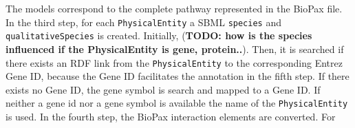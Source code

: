 \documentclass{bioinfo}
\begin{document}
\begin{methods}
The models correspond to the complete pathway represented in the BioPax file.
In the third step, for each \texttt{PhysicalEntity} a SBML \texttt{species} and \texttt{qualitativeSpecies} is created.
Initially, (\textbf{TODO: how is the species influenced if the PhysicalEntity is gene, protein..}).
Then, it is searched if there exists an RDF link from the \texttt{PhysicalEntity} to the corresponding Entrez Gene ID, because the Gene ID facilitates the annotation in the fifth step.
If there exists no Gene ID, the gene symbol is search and mapped to a Gene ID.
If neither a gene id nor a gene symbol is available the name of the \texttt{PhysicalEntity} is used.
In the fourth step, the BioPax interaction elements are converted. For



\end{methods}
\end{document}
